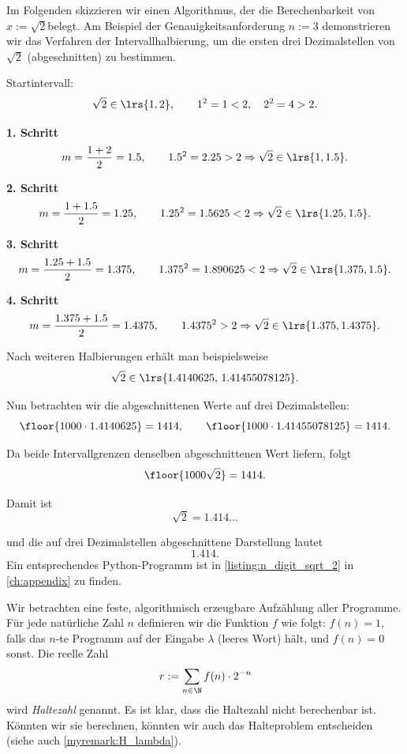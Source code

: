 \begin{myexample}
Im Folgenden skizzieren wir einen Algorithmus, der die Berechenbarkeit von $x:=\sqrt{2}$​ belegt. Am Beispiel der Genauigkeitsanforderung $n:=3$ demonstrieren wir das Verfahren der Intervallhalbierung, um die ersten drei Dezimalstellen von $\sqrt{2}$ (abgeschnitten) zu bestimmen.

Startintervall:
\[
\sqrt{2} \in \lrs{1,2},
\qquad
1^2 = 1 < 2,\quad 2^2 = 4 > 2.
\]

\textbf{1. Schritt}
\[
m=\frac{1+2}{2}=1.5,\qquad 1.5^2=2.25>2 \Rightarrow \sqrt{2}\in\lrs{1,1.5}.
\]

\textbf{2. Schritt}
\[
m=\frac{1+1.5}{2}=1.25,\qquad 1.25^2=1.5625<2 \Rightarrow \sqrt{2}\in\lrs{1.25,1.5}.
\]

\textbf{3. Schritt}
\[
m=\frac{1.25+1.5}{2}=1.375,\qquad 1.375^2=1.890625<2 \Rightarrow \sqrt{2}\in\lrs{1.375,1.5}.
\]

\textbf{4. Schritt}
\[
m=\frac{1.375+1.5}{2}=1.4375,\qquad 1.4375^2>2 \Rightarrow \sqrt{2}\in\lrs{1.375,1.4375}.
\]

Nach weiteren Halbierungen erhält man beispielsweise
\[
\sqrt{2}\in\lrs{1.4140625,\,1.41455078125}.
\]

Nun betrachten wir die abgeschnittenen Werte auf drei Dezimalstellen:
\[
\floor{1000\cdot 1.4140625} = 1414,
\qquad
\floor{1000\cdot 1.41455078125} = 1414.
\]

Da beide Intervallgrenzen denselben abgeschnittenen Wert liefern, folgt
\[
\floor{1000\sqrt{2}} = 1414.
\]

Damit ist
\[
\sqrt{2}=1.414\ldots
\]

und die auf drei Dezimalstellen abgeschnittene Darstellung lautet
\[
1.414.
\]
Ein entsprechendes Python-Programm ist in \cref{listing:n_digit_sqrt_2} in \cref{ch:appendix} zu finden.
\end{myexample}

\begin{myexample}
Wir betrachten eine feste, algorithmisch erzeugbare Aufzählung aller Programme. Für jede natürliche Zahl $n$ definieren wir die Funktion $f$ wie folgt: $f(n) = 1$, falls das $n$-te Programm auf der Eingabe $\lambda$ (leeres Wort) hält, und $f(n) = 0$ sonst. Die reelle Zahl
\begin{align*}
	r := \sum_{n\in\N}f(n)\cdot 2^{-n}
\end{align*}
wird \emph{Haltezahl} genannt. Es ist klar, dass die Haltezahl nicht berechenbar ist. Könnten wir sie berechnen, könnten wir auch das Halteproblem entscheiden (siehe auch \cref{myremark:H_lambda}).
\end{myexample}
